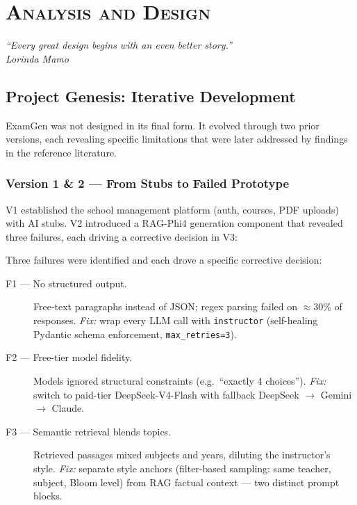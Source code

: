 \newpage
\section{\textsc{Analysis and Design}}
\label{chap:arch}
\lhead{}
\cfoot{\thepage}
\pagestyle{fancy}
\renewcommand{\headrulewidth}{0.4pt}

\begin{flushright}
\textit{``Every great design begins with an even better story.''\\
Lorinda Mamo}
\end{flushright}

\subsection{Project Genesis: Iterative Development}

ExamGen was not designed in its final form. It evolved through two prior versions,
each revealing specific limitations that were later addressed by findings in the
reference literature.

\subsubsection{Version 1 \& 2 --- From Stubs to Failed Prototype}

V1 established the school management platform (auth, courses, PDF uploads) with
AI stubs. V2 introduced a RAG-Phi4 generation component that revealed three
failures, each driving a corrective decision in V3:

Three failures were identified and each drove a specific corrective decision:

\begin{description}
  \item[F1 --- No structured output.] Free-text paragraphs instead of JSON;
  regex parsing failed on $\approx$30\% of responses.
  \textit{Fix:} wrap every LLM call with \texttt{instructor} \cite{instructor2023}
  (self-healing Pydantic schema enforcement, \texttt{max\_retries=3}).

  \item[F2 --- Free-tier model fidelity.] Models ignored structural constraints
  (e.g.\ ``exactly 4 choices'').
  \textit{Fix:} switch to paid-tier DeepSeek-V4-Flash \cite{deepseek2024}
  with fallback DeepSeek $\to$ Gemini $\to$ Claude.

  \item[F3 --- Semantic retrieval blends topics.] Retrieved passages mixed subjects
  and years, diluting the instructor's style.
  \textit{Fix:} separate style anchors (filter-based sampling: same teacher, subject,
  Bloom level) from RAG factual context --- two distinct prompt blocks.
\end{description}

